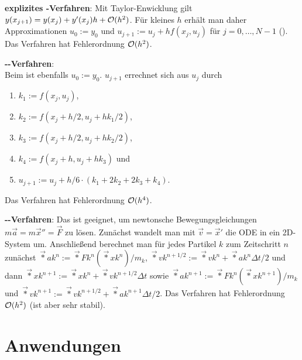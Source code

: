 \textbf{explizites -Verfahren}:
Mit Taylor-Enwicklung gilt $y(x_{j+1}) = y(x_j) + y'(x_j) h + \mathcal{O}(h^2)$.
Für kleines $h$ erhält man daher Approximationen
$u_0 := y_0$ und $u_{j+1} := u_j + h f(x_j, u_j)$ für $j = 0, \dotsc, N-1$
().
Das Verfahren hat Fehlerordnung $\mathcal{O}(h^2)$.

\linie

\textbf{--Verfahren}:\\
Beim  ist ebenfalls $u_0 := y_0$.
$u_{j+1}$ errechnet sich aus $u_j$ durch
\begin{enumerate}
    \item
    $k_1 := f(x_j, u_j)$,

    \item
    $k_2 := f(x_j + h/2, u_j + hk_1/2)$,

    \item
    $k_3 := f(x_j + h/2, u_j + hk_2/2)$,

    \item
    $k_4 := f(x_j + h, u_j + hk_3)$ und

    \item
    $u_{j+1} := u_j + h/6 \cdot (k_1 + 2k_2 + 2k_3 + k_4)$.
\end{enumerate}
Das Verfahren hat Fehlerordnung $\mathcal{O}(h^4)$.

\linie

\textbf{--Verfahren}:
Das  ist geeignet,
um newtonsche Bewegungsgleichungen $m\vec{a} = m\vec{x}'' = \vec{F}$ zu lösen.
Zunächst wandelt man mit $\vec{v} = \vec{x}'$ die ODE in ein 2D-System um.
Anschließend berechnet man für jedes Partikel $k$ zum Zeitschritt $n$ zunächst
$\vec*{a}{k}^n := \vec*{F}{k}^n(\vec*{x}{k}^n)/m_k$,
$\vec*{v}{k}^{n+1/2} := \vec*{v}{k}^n + \vec*{a}{k}^n \Delta t/2$ und dann
$\vec*{x}{k}^{n+1} := \vec*{x}{k}^n + \vec*{v}{k}^{n+1/2} \Delta t$ sowie
$\vec*{a}{k}^{n+1} := \vec*{F}{k}^n(\vec*{x}{k}^{n+1})/m_k$ und
$\vec*{v}{k}^{n+1} := \vec*{v}{k}^{n+1/2} + \vec*{a}{k}^{n+1} \Delta t/2$.
Das Verfahren hat Fehlerordnung $\mathcal{O}(h^2)$ (ist aber sehr stabil).

\pagebreak

\section{%
    Anwendungen%
}

